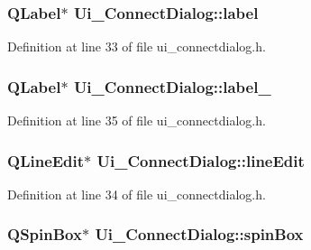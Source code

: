 \subsubsection[{label}]{\setlength{\rightskip}{0pt plus 5cm}Q\+Label$\ast$ Ui\+\_\+\+Connect\+Dialog\+::label}\label{class_ui___connect_dialog_a2e741e9c70f18503f0ceb91b8e8a3292}


Definition at line 33 of file ui\+\_\+connectdialog.\+h.

\hypertarget{class_ui___connect_dialog_aeef1dbbd7d3fe17fe5a871826cb30c5d}{}
\subsubsection[{label\+\_\+2}]{\setlength{\rightskip}{0pt plus 5cm}Q\+Label$\ast$ Ui\+\_\+\+Connect\+Dialog\+::label\+\_}\label{class_ui___connect_dialog_aeef1dbbd7d3fe17fe5a871826cb30c5d}


Definition at line 35 of file ui\+\_\+connectdialog.\+h.

\hypertarget{class_ui___connect_dialog_ae23bcf95328e384b2dc7be1e6de259c2}{}
\subsubsection[{line\+Edit}]{\setlength{\rightskip}{0pt plus 5cm}Q\+Line\+Edit$\ast$ Ui\+\_\+\+Connect\+Dialog\+::line\+Edit}\label{class_ui___connect_dialog_ae23bcf95328e384b2dc7be1e6de259c2}


Definition at line 34 of file ui\+\_\+connectdialog.\+h.

\hypertarget{class_ui___connect_dialog_a8abb10584abfb47b50cd8e37a5dadc83}{}
\subsubsection[{spin\+Box}]{\setlength{\rightskip}{0pt plus 5cm}Q\+Spin\+Box$\ast$ Ui\+\_\+\+Connect\+Dialog\+::spin\+Box}\label{class_ui___connect_dialog_a8abb10584abfb47b50cd8e37a5dadc83}



